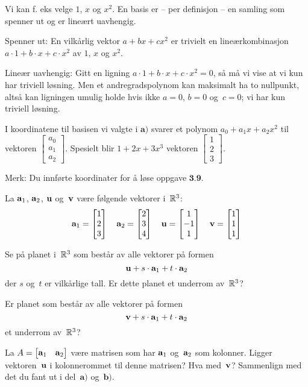 \begin{losning}


\begin{punkt}
Vi kan f. eks velge $1$, $x$ og $x^2$. En basis er -- per definisjon -- en samling som spenner ut og er lineært uavhengig.

\noindent
Spenner ut: En vilkårlig vektor $a+bx+cx^2$ er trivielt en lineærkombinasjon $a\cdot 1+b\cdot x+c\cdot x^2$ av $1$, $x$ og $x^2$.

\noindent
Lineær uavhengig: Gitt en ligning $a\cdot 1+b\cdot x+c\cdot x^2=0$, så må vi vise at vi kun har triviell løsning. Men et andregradspolynom kan maksimalt ha to nullpunkt, altså kan ligningen umulig holde hvis ikke $a=0$, $b=0$ og~$c=0$; vi har kun triviell løsning.
\end{punkt}


\begin{punkt}
I koordinatene til basisen vi valgte i $\textbf{a)}$ svarer et polynom $a_0+a_1x+a_2x^2$ til vektoren $\begin{bmatrix}
a_0\\
a_1\\
a_2
\end{bmatrix}.$ Spesielt blir $1+2x+3x^3$ vektoren $\begin{bmatrix}
1\\
2\\
3
\end{bmatrix}.$


\noindent
Merk: Du innførte koordinater for å løse oppgave $\textbf{3.9.}$
\end{punkt}

\end{losning}


\begin{oppgave}
La $\mathbf{a}_1$, $\mathbf{a}_2$, $\mathbf{u}$ og~$\mathbf{v}$ være følgende vektorer i~$\mathbb{R}^3$:
\[
\mathbf{a}_1 = \begin{bmatrix} 1 \\ 2 \\ 3 \end{bmatrix}
\quad
\mathbf{a}_2 = \begin{bmatrix} 2 \\ 3 \\ 4 \end{bmatrix}
\quad
\mathbf{u} = \begin{bmatrix} 1 \\ -1 \\ 1 \end{bmatrix}
\quad
\mathbf{v} = \begin{bmatrix} 1 \\ 1 \\ 1 \end{bmatrix}
\]
\begin{punkt}
Se på planet i~$\mathbb{R}^3$ som består av alle vektorer på formen
\[
\mathbf{u} + s \cdot \mathbf{a}_1 + t \cdot \mathbf{a}_2
\]
der $s$ og~$t$ er vilkårlige tall.  Er dette planet et underrom
av~$\mathbb{R}^3$?
\end{punkt}
\begin{punkt}
Er planet som består av alle vektorer på formen
\[
\mathbf{v} + s \cdot \mathbf{a}_1 + t \cdot \mathbf{a}_2
\]
et underrom av~$\mathbb{R}^3$?
\end{punkt}
\begin{punkt}
La $A = \begin{bmatrix} \mathbf{a}_1 & \mathbf{a}_2 \end{bmatrix}$
være matrisen som har $\mathbf{a}_1$ og~$\mathbf{a}_2$ som kolonner.
Ligger vektoren~$\mathbf{u}$ i kolonnerommet til denne matrisen?
Hva med~$\mathbf{v}$?
Sammenlign med det du fant ut i del~$\textbf{a)}$ og~$\textbf{b)}$.
\end{punkt}
\end{oppgave}

